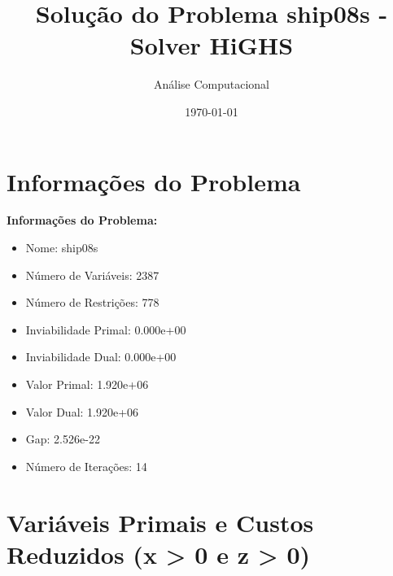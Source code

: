 \documentclass[12pt]{article}
\title{Solução do Problema ship08s - Solver HiGHS}
\author{Análise Computacional}
\date{\today}
\begin{document}
\maketitle

\section{Informações do Problema}

\textbf{Informações do Problema:}
\begin{itemize}
\item Nome: ship08s
\item Número de Variáveis: 2387
\item Número de Restrições: 778
\item Inviabilidade Primal: 0.000e+00
\item Inviabilidade Dual: 0.000e+00
\item Valor Primal: 1.920e+06
\item Valor Dual: 1.920e+06
\item Gap: 2.526e-22
\item Número de Iterações: 14
\end{itemize}


\section{Variáveis Primais e Custos Reduzidos (x > 0 e z > 0)}
\end{document}
